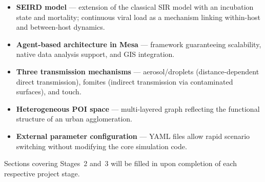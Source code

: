\documentclass[english]{projectreport}
\begin{document}
\begin{itemize}
  \item \textbf{SEIRD model} --- extension of the classical SIR model with an
        incubation state and mortality; continuous viral load as a mechanism
        linking within-host and between-host dynamics.
  \item \textbf{Agent-based architecture in Mesa} --- framework guaranteeing
        scalability, native data analysis support, and GIS integration.
  \item \textbf{Three transmission mechanisms} --- aerosol/droplets
        (distance-dependent direct transmission), fomites (indirect
        transmission via contaminated surfaces), and touch.
  \item \textbf{Heterogeneous POI space} --- multi-layered graph reflecting
        the functional structure of an urban agglomeration.
  \item \textbf{External parameter configuration} --- YAML files allow rapid
        scenario switching without modifying the core simulation code.
\end{itemize}

Sections covering Stages~2 and~3 will be filled in upon completion of each
respective project stage.

\printbibliography

\end{document}
